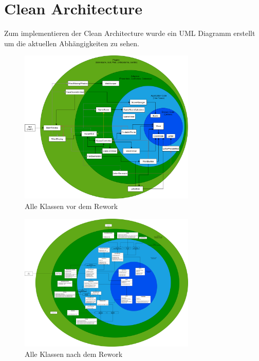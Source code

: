 \chapter{Clean Architecture}

Zum implementieren der Clean Architecture wurde ein UML Diagramm erstellt um die aktuellen Abhängigkeiten zu sehen.

\begin{figure}[!h]
  \centering
  \includegraphics[width=0.75\textwidth]{Bilder/CleanArchitectureBEFORE.PNG}
  \caption{Alle Klassen vor dem Rework}
\end{figure}

\begin{figure}[!h]
  \centering
  \includegraphics[width=0.75\textwidth]{Bilder/CleanArchitectureAFTER.PNG}
  \caption{Alle Klassen nach dem Rework}
\end{figure}

\endinput